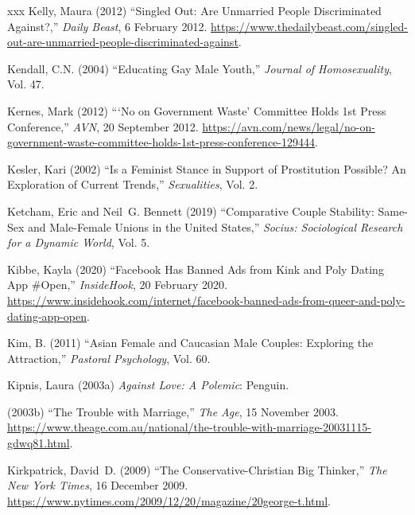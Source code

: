 \documentclass[]{jlreq} \usepackage{mystyle}
\begin{document}
\begin{thebibliography}{xxx}
Kelly, Maura (2012) ``Singled Out: Are Unmarried People Discriminated
  Against?,'' \emph{Daily Beast}, 6 February 2012.
  \url{https://www.thedailybeast.com/singled-out-are-unmarried-people-discriminated-against}.

Kendall, C.N. (2004) ``Educating Gay Male Youth,'' \textit{ Journal of
  Homosexuality}, Vol. 47.

Kernes, Mark (2012) ```No on Government Waste' Committee Holds 1st Press
  Conference,'' \emph{AVN}, 20 September 2012.
  \url{https://avn.com/news/legal/no-on-government-waste-committee-holds-1st-press-conference-129444}.

Kesler, Kari (2002) ``Is a Feminist Stance in Support of Prostitution Possible?
  An Exploration of Current Trends,'' \textit{ Sexualities}, Vol. 2.

Ketcham, Eric and Neil~G. Bennett (2019) ``Comparative Couple Stability:
  Same-Sex and Male-Female Unions in the United States,'' \textit{ Socius:
  Sociological Research for a Dynamic World}, Vol. 5.

Kibbe, Kayla (2020) ``Facebook Has Banned Ads from Kink and Poly Dating App
  \#Open,'' \emph{InsideHook}, 20 February 2020.
  \url{https://www.insidehook.com/internet/facebook-banned-ads-from-queer-and-poly-dating-app-open}.

Kim, B. (2011) ``Asian Female and Caucasian Male Couples: Exploring the
  Attraction,'' \textit{ Pastoral Psychology}, Vol. 60.

Kipnis, Laura (2003a)  \textit{ Against Love: A Polemic}: Penguin.

 \bysame{}  (2003b) ``The Trouble with Marriage,'' \emph{The Age}, 15 November
  2003.
  \url{https://www.theage.com.au/national/the-trouble-with-marriage-20031115-gdwq81.html}.

Kirkpatrick, David~D. (2009) ``The Conservative-Christian Big Thinker,''
  \emph{The New York Times}, 16 December 2009.
  \url{https://www.nytimes.com/2009/12/20/magazine/20george-t.html}.


\end{thebibliography}
\end{document}
